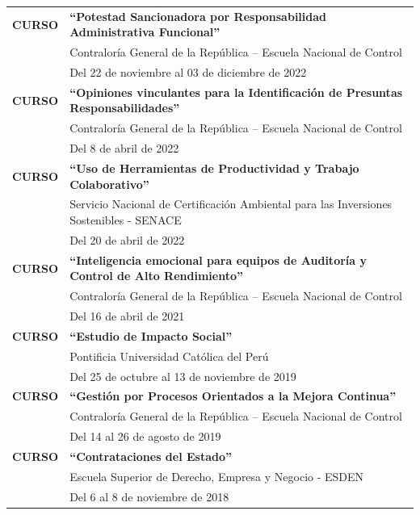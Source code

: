 \documentclass[11pt,a4paper]{article}
\begin{document}
\noindent
\begin{tabularx}{\textwidth}{@{}l@{\hspace{1em}}X@{}}
\textbf{CURSO} & \textbf{``Potestad Sancionadora por Responsabilidad Administrativa Funcional''}\\
& Contralor\'ia General de la Rep\'ublica -- Escuela Nacional de Control\\
& Del 22 de noviembre al 03 de diciembre de 2022\\[5pt]

\textbf{CURSO} & \textbf{``Opiniones vinculantes para la Identificaci\'on de Presuntas Responsabilidades''}\\
& Contralor\'ia General de la Rep\'ublica -- Escuela Nacional de Control\\
& Del 8 de abril de 2022\\[5pt]

\textbf{CURSO} & \textbf{``Uso de Herramientas de Productividad y Trabajo Colaborativo''}\\
& Servicio Nacional de Certificaci\'on Ambiental para las Inversiones Sostenibles - SENACE\\
& Del 20 de abril de 2022\\[5pt]

\textbf{CURSO} & \textbf{``Inteligencia emocional para equipos de Auditor\'ia y Control de Alto Rendimiento''}\\
& Contralor\'ia General de la Rep\'ublica -- Escuela Nacional de Control\\
& Del 16 de abril de 2021\\[5pt]

\textbf{CURSO} & \textbf{``Estudio de Impacto Social''}\\
& Pontificia Universidad Cat\'olica del Per\'u\\
& Del 25 de octubre al 13 de noviembre de 2019\\[5pt]

\textbf{CURSO} & \textbf{``Gesti\'on por Procesos Orientados a la Mejora Continua''}\\
& Contralor\'ia General de la Rep\'ublica -- Escuela Nacional de Control\\
& Del 14 al 26 de agosto de 2019\\[5pt]

\textbf{CURSO} & \textbf{``Contrataciones del Estado''}\\
& Escuela Superior de Derecho, Empresa y Negocio - ESDEN\\
& Del 6 al 8 de noviembre de 2018\\[5pt]


\end{tabularx}
\end{document}
